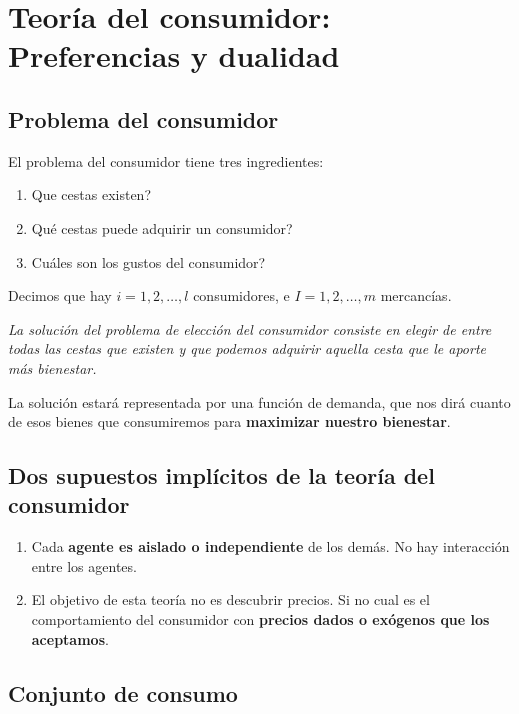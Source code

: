 \chapter{Teoría del consumidor: Preferencias y dualidad}

\section{Problema del consumidor}
El problema del consumidor tiene tres ingredientes:

\begin{enumerate}
    \item Que cestas existen?
    \item Qué cestas puede adquirir un consumidor?
    \item Cuáles son los gustos del consumidor?
\end{enumerate}

Decimos que hay $i=1,2,\ldots,l$ consumidores, e $I=1,2,\ldots,m$ mercancías.\\

\begin{center}
    \textit{La solución del problema de elección del consumidor consiste en elegir de entre todas las cestas que existen y que podemos adquirir aquella cesta que le aporte más bienestar.}
\end{center}

La solución estará representada por una función de demanda, que nos dirá cuanto de esos bienes que consumiremos para \textbf{maximizar nuestro bienestar}.\\



\section{Dos supuestos implícitos de la teoría del consumidor}

\begin{enumerate}
    \item Cada \textbf{agente es aislado o independiente} de los demás. No hay interacción entre los agentes.
    \item El objetivo de esta teoría no es descubrir precios. Si no cual es el comportamiento del consumidor con \textbf{precios dados o exógenos que los aceptamos}.
\end{enumerate}

\section{Conjunto de consumo}

